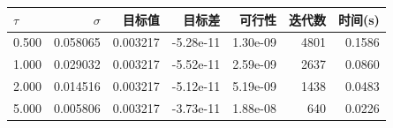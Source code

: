 \begin{center}
\small
\begin{tabular}{lrrrrrr}
\toprule
$\tau$ & $\sigma$ & 目标值 & 目标差 & 可行性 & 迭代数 & 时间(s) \\
\midrule
0.500 & 0.058065 & 0.003217 & -5.28e-11 & 1.30e-09 & 4801 & 0.1586 \\
1.000 & 0.029032 & 0.003217 & -5.52e-11 & 2.59e-09 & 2637 & 0.0860 \\
2.000 & 0.014516 & 0.003217 & -5.12e-11 & 5.19e-09 & 1438 & 0.0483 \\
5.000 & 0.005806 & 0.003217 & -3.73e-11 & 1.88e-08 & 640 & 0.0226 \\
\bottomrule
\end{tabular}
\end{center}